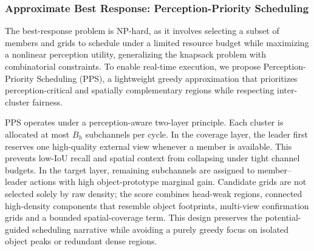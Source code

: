 \documentclass[conference]{IEEEtran}
\begin{document}
\subsubsection{Approximate Best Response: Perception-Priority Scheduling}

The best-response problem is NP-hard, as it involves selecting a subset of members and grids to schedule under a limited resource budget while maximizing a nonlinear perception utility, generalizing the knapsack problem with combinatorial constraints. To enable real-time execution, we propose Perception-Priority Scheduling (PPS), a lightweight greedy approximation that prioritizes perception-critical and spatially complementary regions while respecting inter-cluster fairness.

PPS operates under a perception-aware two-layer principle. Each cluster is allocated at most $B_h$ subchannels per cycle. In the coverage layer, the leader first reserves one high-quality external view whenever a member is available. This prevents low-IoU recall and spatial context from collapsing under tight channel budgets. In the target layer, remaining subchannels are assigned to member--leader actions with high object-prototype marginal gain. Candidate grids are not selected solely by raw density; the score combines head-weak regions, connected high-density components that resemble object footprints, multi-view confirmation grids and a bounded spatial-coverage term. This design preserves the potential-guided scheduling narrative while avoiding a purely greedy focus on isolated object peaks or redundant dense regions.
\end{document}
